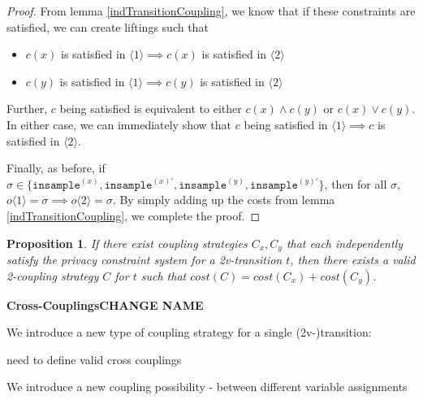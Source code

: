 \documentclass[12pt]{article}
\newcommand{\brangle}[1]{\langle #1 \rangle}
\newtheorem{prop}[thm]{Proposition}
\theoremstyle{definition}
\begin{document}
\begin{proof}
    From lemma \ref{indTransitionCoupling}, we know that if these constraints are satisfied, we can create liftings such that \begin{itemize}
        \item $c(x)$ is satisfied in $\brangle{1}\implies c(x)$ is satisfied in $\brangle{2}$
        \item $c(y)$ is satisfied in $\brangle{1}\implies c(y)$ is satisfied in $\brangle{2}$
    \end{itemize}
    Further, $c$ being satisfied is equivalent to either $c(x)\land c(y)$ or $c(x)\lor c(y)$. In either case, we can immediately show that $c$ being satisfied in $\brangle{1}\implies c$ is satisfied in $\brangle{2}$.

    Finally, as before, if $\sigma \in \{\texttt{insample}^{(x)}, \texttt{insample}^{(x)\prime}, \texttt{insample}^{(y)},\texttt{insample}^{(y)\prime}\}$, then for all $\sigma$, $o\brangle{1}=\sigma \implies o\brangle{2} = \sigma$. By simply adding up the costs from lemma \ref{indTransitionCoupling}, we complete the proof.
\end{proof}



\begin{prop}
    If there exist coupling strategies $C_x, C_y$ that each independently satisfy the privacy constraint system for a 2v-transition $t$, then there exists a valid 2-coupling strategy $C$ for $t$ such that $cost(C) = cost(C_x)+cost(C_y)$. 
\end{prop}

\textbf{Cross-Couplings{\color{red}CHANGE NAME}}

We introduce a new type of coupling strategy for a single (2v-)transition:

{\color{red} need to define valid cross couplings}

We introduce a new coupling possibility - between different variable assignments
\end{document}
